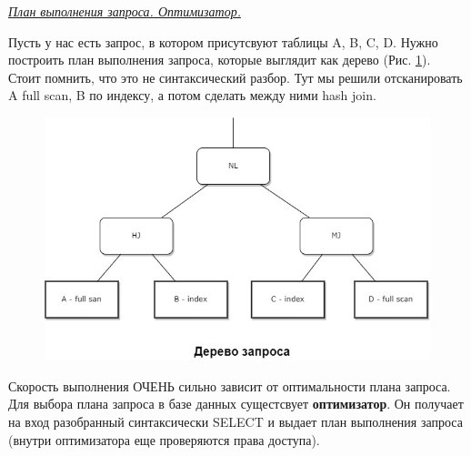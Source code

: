 \begin{center}
\textit{\underline{План выполнения запроса. Оптимизатор.}}
\end{center}

Пусть у нас есть запрос, в котором присутсвуют таблицы A, B, C, D. Нужно построить план выполнения запроса, которые выглядит как дерево (Рис. \ref{fig:plan1}). Стоит помнить, что это не синтаксический разбор. Тут мы решили отсканировать A full scan, B по индексу, а потом сделать между ними hash join. 

\begin{figure}[h!]
    \centering
    \includegraphics[scale = 0.5]{5/plan.jpg}
    \caption{}
    \label{fig:plan1}
\end{figure}

Скорость выполнения ОЧЕНЬ сильно зависит от оптимальности плана запроса.
\\[20pt]
Для выбора плана запроса в базе данных сущестсвует \textbf{оптимизатор}. Он получает на вход разобранный синтаксически SELECT и выдает план выполнения запроса (внутри оптимизатора еще проверяются права доступа). 

